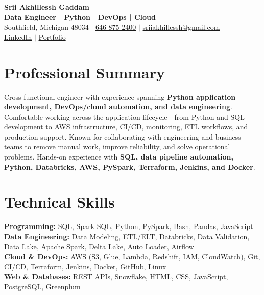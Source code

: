\documentclass[letterpaper,10pt]{article}
\begin{document}
\fontsize{9.35pt}{10.45pt}\selectfont

\begin{center}
    {\LARGE \textbf{Srii Akhillessh Gaddam}} \\[-1pt]
    \textbf{Data Engineer | Python | DevOps | Cloud} \\[2pt]
    Southfield, Michigan 48034 $|$
    \href{tel:6468752400}{646-875-2400} $|$
    \href{mailto:sriiakhillessh@gmail.com}{sriiakhillessh@gmail.com} \\[1pt]
    \href{https://www.linkedin.com/in/srii-akhiilessh-gaddam-b48668191/}{LinkedIn} $|$
    \href{https://sriiakhillesshg.github.io/portfolio/}{Portfolio}
\end{center}
\vspace{-8pt}

\section{Professional Summary}
\small{Cross-functional engineer with experience spanning \textbf{Python application development, DevOps/cloud automation, and data engineering}. Comfortable working across the application lifecycle - from Python and SQL development to AWS infrastructure, CI/CD, monitoring, ETL workflows, and production support. Known for collaborating with engineering and business teams to remove manual work, improve reliability, and solve operational problems. Hands-on experience with \textbf{SQL, data pipeline automation, Python, Databricks, AWS, PySpark, Terraform, Jenkins, and Docker}.}

\section{Technical Skills}
\small{
\textbf{Programming:} SQL, Spark SQL, Python, PySpark, Bash, Pandas, JavaScript \\
\textbf{Data Engineering:} Data Modeling, ETL/ELT, Databricks, Data Validation, Data Lake, Apache Spark, Delta Lake, Auto Loader, Airflow \\
\textbf{Cloud \& DevOps:} AWS (S3, Glue, Lambda, Redshift, IAM, CloudWatch), Git, CI/CD, Terraform, Jenkins, Docker, GitHub, Linux \\
\textbf{Web \& Databases:} REST APIs, Snowflake, HTML, CSS, JavaScript, PostgreSQL, Greenplum
}
\end{document}
